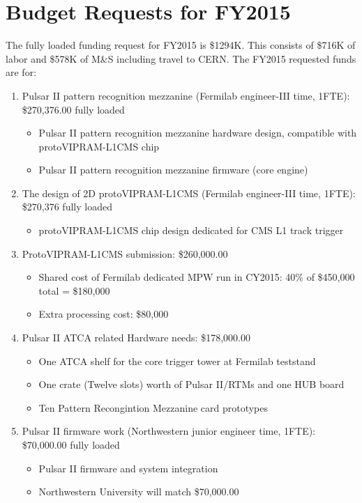 \section{Budget Requests for FY2015}

The fully loaded funding request for FY2015 is \$1294K. This consists of \$716K of labor and \$578K of M\&S including travel to CERN. 
The FY2015 requested funds are for: 

\begin{enumerate}
\item Pulsar II pattern recognition mezzanine (Fermilab engineer-III time, 1FTE): \$270,376.00 fully loaded
	\begin{itemize}	
	\item	Pulsar II pattern recognition mezzanine hardware design, compatible with protoVIPRAM-L1CMS chip
        \item       Pulsar II pattern recognition mezzanine firmware (core engine)
	\end{itemize}

\item The design of 2D protoVIPRAM-L1CMS (Fermilab engineer-III time, 1FTE): \$270,376 fully loaded
	\begin{itemize}
	\item	protoVIPRAM-L1CMS chip design dedicated for CMS L1 track trigger
	\end{itemize}

\item ProtoVIPRAM-L1CMS submission: \$260,000.00 
	\begin{itemize}
	\item	Shared cost of Fermilab dedicated MPW run in CY2015: 40\% of \$450,000 total = \$180,000
        \item       Extra processing cost:   \$80,000
	\end{itemize}	

\item Pulsar II ATCA related Hardware needs: \$178,000.00 
	\begin{itemize}
	\item	One ATCA shelf for the core trigger tower at Fermilab teststand
	\item	One crate (Twelve slots) worth of Pulsar II/RTMs and one HUB board
       \item        Ten Pattern Recongintion Mezzanine card prototypes
	\end{itemize}	

\item Pulsar II firmware work (Northwestern junior engineer time, 1FTE): \$70,000.00 fully loaded
	\begin{itemize}
        \item       Pulsar II firmware and system integration 
        \item       Northwestern University will match \$70,000.00
	\end{itemize}


\end{enumerate}
